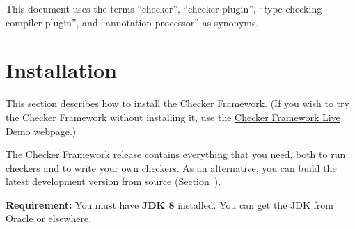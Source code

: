 





This document uses the terms ``checker'', ``checker plugin'',
``type-checking compiler plugin'', and ``annotation processor'' as
synonyms.

\section{Installation\label{installation}}

\begin{sloppypar}
This section describes how to install the Checker Framework.
(If you wish to try the Checker Framework without installing it, use the
\href{http://eisop.uwaterloo.ca/live/}{Checker Framework Live Demo} webpage.)
\end{sloppypar}

The Checker Framework release contains everything that you need, both to
run checkers and to write your own checkers.  As an alternative, you can
build the latest development version from source
(Section~).

\textbf{Requirement:}
You must have \textbf{JDK 8}
installed.  You can get the JDK from
\href{http://www.oracle.com/technetwork/java/javase/downloads/index.html}{Oracle}
or elsewhere.

